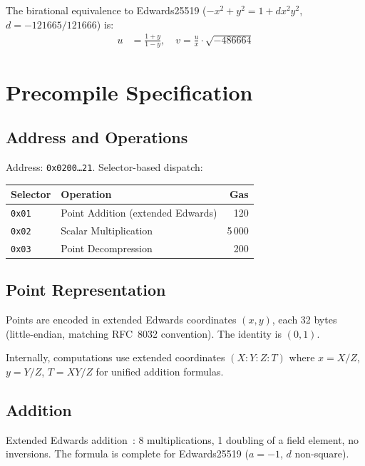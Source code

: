 \documentclass[11pt,a4paper]{article}
\begin{document}
The birational equivalence to Edwards25519 ($-x^2 + y^2 = 1 + d x^2 y^2$,
$d = -121665/121666$) is:
\begin{align}
  u &= \frac{1+y}{1-y}, \quad v = \frac{u}{x} \cdot \sqrt{-486664}
\end{align}

\section{Precompile Specification}

\subsection{Address and Operations}

Address: \texttt{0x0200\ldots21}. Selector-based dispatch:

\begin{table}[H]
\centering
\begin{tabular}{llr}
\toprule
\textbf{Selector} & \textbf{Operation} & \textbf{Gas} \\
\midrule
\texttt{0x01} & Point Addition (extended Edwards) & 120 \\
\texttt{0x02} & Scalar Multiplication & 5\,000 \\
\texttt{0x03} & Point Decompression & 200 \\
\bottomrule
\end{tabular}
\end{table}

\subsection{Point Representation}

Points are encoded in extended Edwards coordinates $(x, y)$, each 32 bytes
(little-endian, matching RFC~8032 convention). The identity is $(0, 1)$.

Internally, computations use extended coordinates $(X : Y : Z : T)$ where
$x = X/Z$, $y = Y/Z$, $T = XY/Z$ for unified addition formulas.

\subsection{Addition}

Extended Edwards addition~\cite{hisil-extended}: 8 multiplications, 1 doubling of
a field element, no inversions. The formula is complete for Edwards25519
($a = -1$, $d$ non-square).
\end{document}
